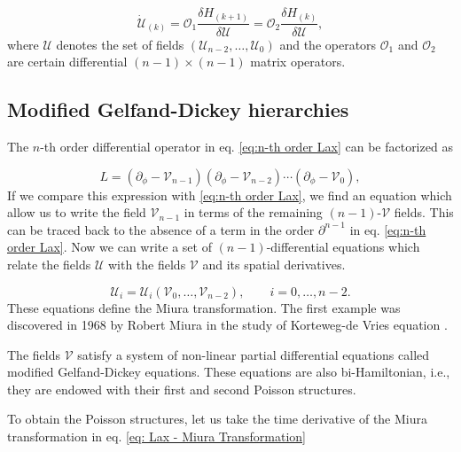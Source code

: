 \documentclass[letterpaper,11pt,oneside]{book}
\begin{document}
\begin{equation}
\dot{\mathcal{U}}_{\left(k\right)} = \mathscr{O}_{1}\frac{\delta H_{\left(k+1\right)}}{\delta\mathcal{U}}=\mathscr{O}_{2}\frac{\delta H_{\left(k\right)}}{\delta\mathcal{U}},\label{eq: Bi-Hamiltonian equations GD}
\end{equation}
where $\mathcal{U}$ denotes the set of fields $\left(\mathcal{U}_{n-2},\ldots,\mathcal{U}_{0}\right)$
and the operators $\mathscr{O}_{1}$ and $\mathscr{O}_{2}$ are certain differential $\left(n-1\right)\times\left(n-1\right)$
matrix operators.

\subsection{Modified Gelfand-Dickey hierarchies}

The $n$-th order differential operator in eq. \eqref{eq:n-th order Lax}
can be factorized as

\begin{equation}
	L=\left(\partial_{\phi}-\mathcal{V}_{n-1}\right)\left(\partial_{\phi}-\mathcal{V}_{n-2}\right)\cdots\left(\partial_{\phi}-\mathcal{V}_{0}\right),\label{eq:n-th order Lax - Miura}
\end{equation}
If we compare this expression with \eqref{eq:n-th order Lax}, we find an equation which allow us to write the field $\mathcal{V}_{n-1}$ in terms of the remaining $\left(n-1\right)$-$\mathcal{V}$ fields. This can be traced back to the absence of a term in the order $\partial^{n-1}$ in eq. \eqref{eq:n-th order Lax}. Now we can write a set of $\left(n-1\right)$-differential equations which relate the fields $\mathcal{U}$ with the fields $\mathcal{V}$ and its spatial derivatives.

\begin{equation}
	\mathcal{U}_{i}=\mathcal{U}_{i}\left(\mathcal{V}_{0},\ldots,\mathcal{V}_{n-2}\right),\qquad i=0,\ldots,n-2.\label{eq: Lax - Miura Transformation}
\end{equation}
These equations define the Miura transformation. The first example
was discovered in 1968 by Robert Miura in the study of Korteweg-de Vries equation \cite{Miura:1968}.

The fields $\mathcal{V}$ satisfy a system of non-linear partial differential
equations called modified Gelfand-Dickey equations. These equations
are also bi-Hamiltonian, i.e., they are endowed with their first and
second Poisson structures.

To obtain the Poisson structures, let us take the time derivative of the Miura transformation in eq. \eqref{eq: Lax - Miura Transformation}
\end{document}
